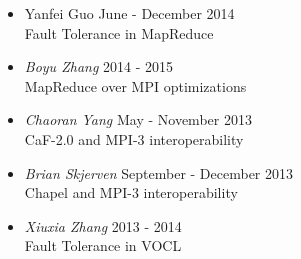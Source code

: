 \begin{itemize}
    \item {Yanfei Guo} \hfill June - December 2014 \\
        Fault Tolerance in MapReduce \\
    \item{\sl Boyu Zhang} \hfill 2014 - 2015 \\
        MapReduce over MPI optimizations \\
    \item{\sl Chaoran Yang} \hfill May - November 2013 \\
        CaF-2.0 and MPI-3 interoperability \\
    \item{\sl Brian Skjerven} \hfill September - December 2013 \\
        Chapel and MPI-3 interoperability \\
    \item{\sl Xiuxia Zhang} \hfill 2013 - 2014 \\
        Fault Tolerance in VOCL \\
\end{itemize}
